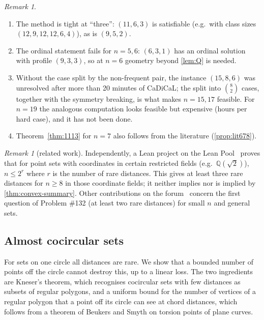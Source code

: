 \documentclass[11pt]{amsart}
\theoremstyle{definition}
\theoremstyle{remark}
\newtheorem{remark}[theorem]{Remark}
\begin{document}
\begin{remark}\label{rem:ordinal}
\begin{enumerate}[leftmargin=2em,label=(\alph*)]
\item The method is tight at ``three'': $(11,6,3)$ is satisfiable (e.g.\ with class sizes $(12,9,12,12,6,4)$), as is $(9,5,2)$.
\item The ordinal statement fails for $n=5,6$: $(6,3,1)$ has an ordinal solution with profile $(9,3,3)$, so at $n=6$ geometry beyond \cref{lem:Q} is needed.
\item Without the case split by the non-frequent pair, the instance $(15,8,6)$ was unresolved after more than 20 minutes of CaDiCaL; the split into $\binom82$ cases, together with the symmetry breaking, is what makes $n=15,17$ feasible. For $n=19$ the analogous computation looks feasible but expensive (hours per hard case), and it has not been done.
\item Theorem~\ref{thm:1113} for $n=7$ also follows from the literature (\cref{prop:lit678}).
\end{enumerate}
\end{remark}

\begin{remark}[related work]
Independently, a Lean project on the Lean Pool~\cite{lyfar} proves that for point sets with coordinates in certain restricted fields (e.g.\ $\mathbb Q(\sqrt2)$), $n\le2^r$ where $r$ is the number of rare distances. This gives at least three rare distances for $n\ge8$ in those coordinate fields; it neither implies nor is implied by \cref{thm:convex-summary}. Other contributions on the forum~\cite{forum132} concern the first question of Problem \#132 (at least two rare distances) for small $n$ and general sets.
\end{remark}

\subsection{Almost cocircular sets}\label{sec:almostcoc}

For sets on one circle all distances are rare. We show that a bounded number of points off the circle cannot destroy this, up to a linear loss. The two ingredients are Kneser's theorem, which recognises cocircular sets with few distances as subsets of regular polygons, and a uniform bound for the number of vertices of a regular polygon that a point off its circle can see at chord distances, which follows from a theorem of Beukers and Smyth on torsion points of plane curves.
\end{document}
